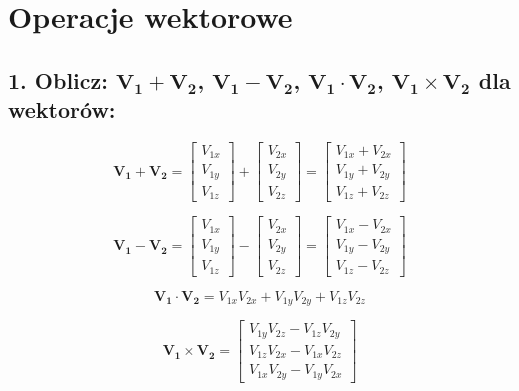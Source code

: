 \section{Operacje wektorowe}



\subsection*{1. Oblicz: $\mathbf{V_1} + \mathbf{V_2}$, $\mathbf{V_1} - \mathbf{V_2}$, $\mathbf{V_1} \cdot \mathbf{V_2}$, $\mathbf{V_1} \times \mathbf{V_2}$ dla wektorów:}


\[
 \mathbf{V_1 + V_2} = \begin{bmatrix} V_{1x} \\ V_{1y} \\ V_{1z} \end{bmatrix}
 + \begin{bmatrix} V_{2x} \\ V_{2y} \\ V_{2z} \end{bmatrix}
 = \begin{bmatrix} V_{1x} + V_{2x} \\ V_{1y} + V_{2y} \\ V_{1z} + V_{2z} \end{bmatrix}
\]

\[
\mathbf{V_1 - V_2} = \begin{bmatrix} V_{1x} \\ V_{1y} \\ V_{1z} \end{bmatrix}
- \begin{bmatrix} V_{2x} \\ V_{2y} \\ V_{2z} \end{bmatrix}
= \begin{bmatrix} V_{1x} - V_{2x} \\ V_{1y} - V_{2y} \\ V_{1z} - V_{2z} \end{bmatrix}
\]

\[
\mathbf{V_1 \cdot V_2} = V_{1x} V_{2x} + V_{1y} V_{2y} + V_{1z} V_{2z}
\]

\[
\mathbf{V_1 \times V_2} =
\begin{bmatrix}
V_{1y} V_{2z} - V_{1z} V_{2y} \\
V_{1z} V_{2x} - V_{1x} V_{2z} \\
V_{1x} V_{2y} - V_{1y} V_{2x}
\end{bmatrix}
\]


